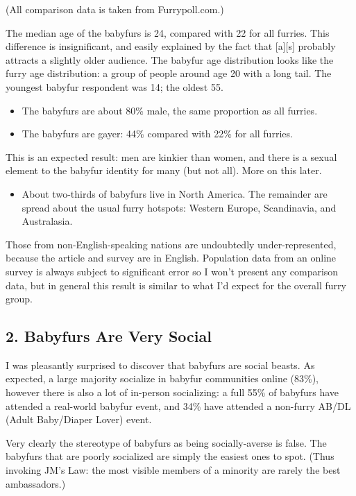 (All comparison data is taken from Furrypoll.com.)

The median age of the babyfurs is 24, compared with 22 for all furries.
This difference is insignificant, and easily explained by the fact that [a][s] probably attracts a slightly older audience. The babyfur age distribution looks like the furry age distribution: a group of people around age 20 with a long tail. The youngest babyfur respondent was 14; the oldest 55.

\begin{itemize}
  \item The babyfurs are about 80\% male, the same proportion as all furries.
  \item The babyfurs are gayer: 44\% compared with 22\% for all furries.
\end{itemize}

This is an expected result: men are kinkier than women, and there is a sexual element to the babyfur identity for many (but not all). More on this later.

\begin{itemize}
  \item About two-thirds of babyfurs live in North America. The remainder are spread about the usual furry hotspots: Western Europe, Scandinavia, and Australasia.
\end{itemize}

Those from non-English-speaking nations are undoubtedly under-represented, because the article and survey are in English. Population data from an online survey is always subject to significant error so I won't present any comparison data, but in general this result is similar to what I'd expect for the overall furry group.

\subsection*{2. Babyfurs Are Very Social}

I was pleasantly surprised to discover that babyfurs are social beasts. As expected, a large majority socialize in babyfur communities online (83\%), however there is also a lot of in-person socializing: a full 55\% of babyfurs have attended a real-world babyfur event, and 34\% have attended a non-furry AB/DL (Adult Baby/Diaper Lover) event.

Very clearly the stereotype of babyfurs as being socially-averse is false. The babyfurs that are poorly socialized are simply the easiest ones to spot. (Thus invoking JM's Law: the most visible members of a minority are rarely the best ambassadors.)

